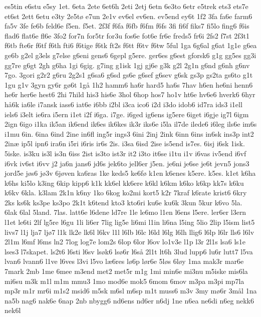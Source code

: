 {es5tin
e6stu
e5sy
1et.
6eta
2ete
6et6h
2eti
2etj
6etn
6e3to
6etr
e5trek
ets3
ets7e
et6st
2ett
6etu
e3ty
2e5t^^f8
e7un
2e1v
ev6el
ev6en.
ev5end
ey6t
1f2
3fa
fa6e
farm6
fa5v
3fe
fe6b
feld6e
f5en.
f5et.
2f3f
f6fa
f6fb
f6fm
f6fs
3fi
fi6f
fiks7
fi5lo
fing6
f6is
flad6
flat6e
fl6e
3fo2
for7n
for5tr
for3u
fos6e
fot6e
fr6e
freds5
fr6i
2fs2
f7st
2f3t1
f6tb
fte6r
f6tf
f6th
fti6
f6tige
f6tk
ft2s
f6tt
f6tv
f6tw
5ful
1ga
6g6al
g6at
1g1e
g6ea
ge6b
g2el
g3els
g7else
g6eni
gens6
6gepl
g5ere.
ger6es
g6est
gforsk6
g1g
gg5es
gg3i
gg7re
g6gt
2gh
g6ha
1gi
6gig.
g7ing
g1isk
1gj
gj6e
g3k
g2l
2g1n
g6nd
g6nh
g6nv
7go.
3gori
g2r2
g6ru
2g2s1
g6sa6
g6sd
gs6e
g6sef
g6sev
g6sk
gs3p
gs2ta
gs6to
g1t
1gu
g1v
3gyn
gy6r
g^^f86t
1g^^e5
1h2
hamm6
ha6r
hard5
ha6s
7hav
h6en
he6ni
henn6
he6r
her6e
hest6
2hi
7hild
his3
his6e
3hol
6hop
hos7
ho1v
ht6e
hv6e6
hverk6
6hyr
h^^e56k
ia6le
i7ansk
iass6
iat6e
i6bb
i2bl
i3ca
ico6
i2d
i3do
idob6
id7ra
ids3
i1ell
iels6
i3elt
ie6ra
i5ern
i1et
i2f
i6ga.
i7ge.
i6ged
ig6ens
ig5ere
6iget
i6gje
ig7l
6igm
2ign
6igo
i1ka
ik5an
ik6end
ik6es
ik6kes
ik3r
iks6e
i5la
il7de
ilede6
i6leg
ils6e
im6s
i1mu
6in.
6ina
6ind
2ine
in6fl
ing5r
ings3
6ini
2inj
2ink
6inn
6ins
in6sk
ins3p
int2
2in^^e6
ip5l
ipn6
ira6n
i5ri
i6ris
ir6s
2is.
i3sa
6isd
2ise
is5end
is7es.
6isj
i6sk
1isk.
5iske.
is3ku
is3l
is3n
6iss
2ist
is3to
ist3r
it2
i3to
it6se
i1tu
i1v
i6vas
iv5end
i6vf
i6vk
iv6st
i6vv
j2
ja6n
jans6
jd6s
jek6to
jell6er
j5en.
je6ni
je6se
je6t
jevn5
jons3
jord5e
j^^f8s6
j^^f83v
6j^^f8ven
ka6ras
1ke
keds5
ke6f^^f8
k1en
k6enes
k5ere.
k5es.
k1et
k6ha
k6hs
ki5lo
k3ing
6kip
kipp6
k1k
kk6el
kk6ere
k6kl
k6km
k6ko
k6kp
kk7s
k6ku
k6kv
6kla.
k3lam
2k1n
k6ny
1ko
6kog
ko2mi
kort5
k2r
7kraf
k6rate
krist6
6kry
2ks
ks6k
ks3pe
ks3po
2k1t
k6tend
kto3
kto6ri
ku6e
ku6k
3kun
5kur
k6vo
5la.
6lak
6lal
5land.
7las.
latt6e
l6dene
ld7re
1le
le6mo
l1en
l6ens
l5ere.
ler6er
l3ern
l1et
le6ti
2lf
lg5re
l6gu
1li
li6er
7lig
lig5e
li6mi
l1in
li6na
l5ing
5lio
2lip
l5ism
list5
livs7
l1j
lja7
lj^^f87
l1k
lk2e
lk6l
l6kv
l1l
l6lb
l6lc
l6ld
l6lg
l6lh
llig6
l6lp
l6lr
lls6
l6lv
2l1m
l6mf
l6ms
ln2
7log
log7e
lom2s
6lop
6lor
l6ov
lo1v3e
l1p
l3r
2l1s
lsa6
ls1e
lses3
l7skapet.
ls2t6
l6sti
l6sv
ls^^f8k6
ls^^f86r
l6s^^e5
2l1t
lt6h
3lud
lupp6
lu6r
lutt7
l5va
lvan6
lvann6
l1ve
l6ves
l3vi
l5vo
l^^e66res
l^^f86p
l^^f8r6e
5l^^f8s
6l^^f8y
1ma
mak3r
mar6e
7mark
2mb
1me
6mee
m3end
met2
met5r
m1g
1mi
min6e
mi3nu
m5iske
mis6la
mi6su
m3k
m1l
m1m
mmu3
1mo
mod6e
mok5
6mom
6mov
m3pa
m3pi
mp7la
mp3r
m1r
mr6i
m1s2
msid6
m5sk
m6sl
m6sp
m1t
muss6
m3v
3my
m^^f86r
3m^^e5l
1na
na5b
nag6
nak6e
6nap
2nb
nbygg6
nd6ens
nd6er
n6dj
1ne
n6ea
ne6di
n6eg
nekk6
nek6l
}
